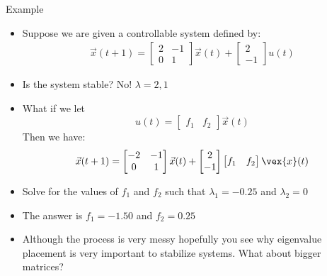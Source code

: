 \documentclass{beamer}
\begin{document}
	\begin{frame}{Example}
	\begin{itemize}
	    \item Suppose we are given a controllable system defined by: 
	        \begin{align*}
	            \vec{x}(t+1) = \begin{bmatrix} 2&-1 \\
	            0&1
	            \end{bmatrix} \vec{x}(t) + \begin{bmatrix} 2 \\ -1 \end{bmatrix}u(t)
	        \end{align*}
	    \item Is the system stable? \pause No! $\lambda = 2, 1$
	    \item What if we let \[ u(t) = \begin{bmatrix} f_1 & f_2 \end{bmatrix}\vec{x}(t)\]  Then we have:   
	        \begin{align*}
	            \vec{x}(t+1) = \begin{bmatrix} -2 & -1 \\
	            0&1
	            \end{bmatrix}\vec{x}(t) + \begin{bmatrix} 2 \\ -1 \end{bmatrix}\begin{bmatrix} f_1 & f_2 \end{bmatrix}\vex{x}(t) 
	        \end{align*}
	    \item Solve for the values of $f_1$ and $f_2$ such that $\lambda_1 = -0.25$ and $\lambda_2 = 0$ \pause
	    \item The answer is $f_1 = -1.50$ and $f_2 = 0.25$ \pause
	    \item Although the process is very messy hopefully you see why eigenvalue placement is very important to stabilize systems. What about bigger matrices?
	\end{itemize}
	\end{frame}
\end{document}
